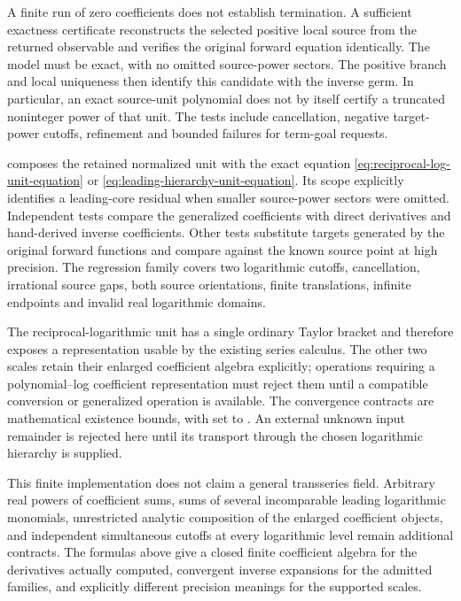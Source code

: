 A finite run of zero coefficients does not establish termination. A
sufficient exactness certificate reconstructs the selected positive local
source from the returned observable and verifies the original forward
equation identically. The model must be exact, with no omitted source-power
sectors. The positive branch and local uniqueness then identify this
candidate with the inverse germ. In particular, an exact source-unit
polynomial does not by itself certify a truncated noninteger power of that
unit. The tests include cancellation, negative target-power cutoffs,
refinement and bounded failures for term-goal requests.

 composes the retained normalized unit with
the exact equation \eqref{eq:reciprocal-log-unit-equation} or
\eqref{eq:leading-hierarchy-unit-equation}. Its scope explicitly identifies
a leading-core residual when smaller source-power sectors were omitted.
Independent tests compare the generalized coefficients with direct
derivatives and hand-derived inverse coefficients. Other tests substitute
targets generated by the original forward functions and compare against
the known source point at high precision. The regression family covers
two logarithmic cutoffs, cancellation, irrational source gaps, both source
orientations, finite translations, infinite endpoints and invalid real
logarithmic domains.

The reciprocal-logarithmic unit has a single ordinary Taylor bracket and
therefore exposes a representation usable by the existing series calculus.
The other two scales retain their enlarged coefficient algebra explicitly;
operations requiring a polynomial--log coefficient representation must
reject them until a compatible conversion or generalized operation is
available. The convergence contracts are mathematical existence bounds,
with  set to . An external unknown
input remainder is rejected here until its transport through the chosen
logarithmic hierarchy is supplied.

This finite implementation does not claim a general transseries field.
Arbitrary real powers of coefficient sums, sums of several incomparable
leading logarithmic monomials, unrestricted analytic composition of the
enlarged coefficient objects, and independent simultaneous cutoffs at
every logarithmic level remain additional contracts. The formulas above
give a closed finite coefficient algebra for the derivatives actually
computed, convergent inverse expansions for the admitted families, and
explicitly different precision meanings for the supported scales.
